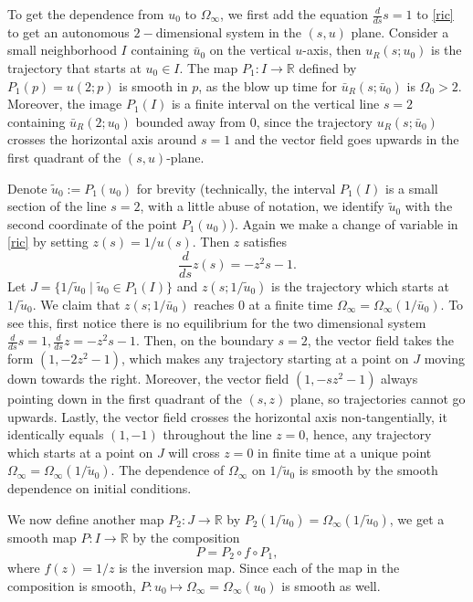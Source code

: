 \begin{Proof} To get the dependence from $u_0$ to $\Omega_\infty$, we first add the equation $\frac{d}{ds}s=1$ to \eqref{ric} to get an autonomous $2-$dimensional system in the $(s,u)$ plane. Consider a small neighborhood $I$ containing $\bar{u}_0$ on the vertical $u$-axis, then $u_R(s; u_0)$ is the trajectory that starts at $u_0 \in I$. The map $P_1 : I \to \mathbb{R}$ defined by $P_1(p) = u(2; p)$ is smooth in $p$, as the blow up time for $\bar{u}_R(s;\bar{u}_0)$ is $\Omega_0 >2$. Moreover, the image $P_1(I)$ is a finite interval on the vertical line $s=2$ containing $\bar{u}_R(2;u_0)$ bounded away from $0$, since the trajectory $u_R(s;\bar{u}_0)$ crosses the horizontal axis around $s=1$ and the vector field goes upwards in the first quadrant of the $(s,u)$-plane.

Denote $\tilde{u}_0:= P_1(u_0)$ for brevity (technically, the interval $P_1(I)$ is a small section of the line $s=2$, with a little abuse of notation, we identify $\tilde{u}_0$ with the second coordinate of the point $P_1(u_0)$). Again we make a change of variable in \eqref{ric} by setting $z(s) = 1/u(s)$. Then $z$ satisfies 
\[
\frac{d}{ds}z(s) = -z^2s -1.
\]
Let $J = \{ 1/\tilde{u}_0 \mid  \tilde{u}_0 \in P_1(I)\}$ and $z(s; 1/\tilde{u}_0)$ is the trajectory which starts at $1/\tilde{u}_0$. We claim that $z(s; 1/\bar{u}_0)$ reaches $0$ at a finite time $\Omega_\infty = \Omega_\infty(1/\bar{u}_0)$. To see this, first notice there is no equilibrium for the two dimensional system $\frac{d}{ds}s=1, \frac{d}{ds}z=-z^2s-1$. Then, on the boundary $s=2$, the vector field takes the form $(1,-2z^2-1)$, which makes any trajectory starting at a point on $J$ moving down towards the right. Moreover, the vector field $(1,-sz^2-1)$ always pointing down in the first quadrant of the $(s,z)$ plane, so trajectories cannot go upwards. Lastly, the vector field crosses the horizontal axis non-tangentially, it identically equals $(1,-1)$ throughout the line $z=0$, hence, any trajectory which starts at a point on $J$ will cross $z=0$ in finite time at a unique point $\Omega_\infty = \Omega_\infty(1/\tilde{u}_0)$. The dependence of $\Omega_\infty$ on $1/\tilde{u}_0$ is smooth by the smooth dependence on initial conditions.

 We now define another map $P_2 : J \to \mathbb{R}$ by $P_2(1/\tilde{u}_0) = \Omega_\infty(1/\tilde{u}_0)$, we get a smooth map $P: I \to \mathbb{R}$ by the composition
 \[
 P =P_2 \circ f \circ P_1,
 \] 
 where $f(z) = 1/z$ is the inversion map. Since each of the map in the composition is smooth, $P: u_0 \mapsto \Omega_\infty = \Omega_\infty(u_0)$ is smooth as well.


\end{Proof}
